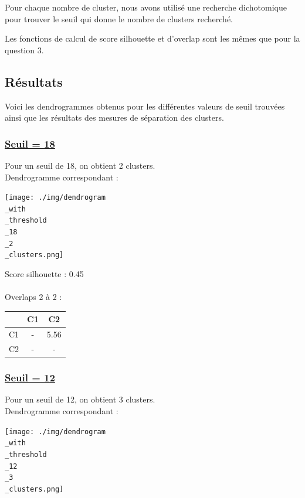 \documentclass{article}
\begin{document}
Pour chaque nombre de cluster, nous avons utilisé une recherche dichotomique 
pour trouver le seuil qui donne le nombre de clusters recherché.

Les fonctions de calcul de score silhouette et d'overlap sont les mêmes que pour
la question 3.

\subsection*{Résultats}

Voici les dendrogrammes obtenus pour les différentes valeurs de seuil trouvées ainsi
que les résultats des mesures de séparation des clusters.

\subsubsection*{\underline{Seuil = 18}}
Pour un seuil de 18, on obtient 2 clusters.\\
Dendrogramme correspondant :

\begin{center}
    \texttt{[image: ./img/dendrogram\\\_with\\\_threshold\\\_18\\\_2\\\_clusters.png]}
\end{center}

\noindent Score silhouette : 0.45\\\\
Overlaps 2 à 2 :\\

\begin{center}
\begin{tabular}{|c|c|c|}
\hline
& C1 & C2 \\
\hline
C1 & - & 5.56 \\
\hline
C2 & - & - \\
\hline
\end{tabular}
\end{center}

\subsubsection*{\underline{Seuil = 12}}
Pour un seuil de 12, on obtient 3 clusters.\\
Dendrogramme correspondant :

\begin{center}
    \texttt{[image: ./img/dendrogram\\\_with\\\_threshold\\\_12\\\_3\\\_clusters.png]}
\end{center}
\end{document}
